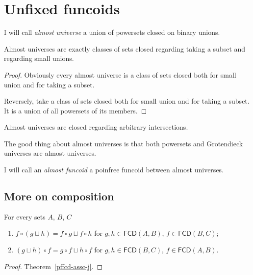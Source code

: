\chapter{Unfixed funcoids}

\begin{defn}
I will call \emph{almost universe}
a union of powersets closed on binary unions.
\end{defn}

\begin{prop}
Almost universes are exactly classes of sets closed regarding taking a subset and regarding small unions.
\end{prop}

\begin{proof}
Obviously every almost universe is a class of sets closed both for small union and for taking a subset.

Reversely, take a class of sets closed both for small union and for taking a subset. It is a union of all powersets of its members.
\end{proof}

\begin{obvious}
Almost universes are closed regarding arbitrary intersections.
\end{obvious}

The good thing about almost universes is that both powersets and Grotendieck universes are almost universes.

\begin{defn}
I will call an \emph{almost funcoid} a poinfree funcoid between almost universes.
\end{defn}

\section{More on composition}

\begin{lem}
For every sets $A$, $B$, $C$
\begin{enumerate}
\item $f\circ(g\sqcup h)=f\circ g\sqcup f\circ h$ for $g,h\in\mathsf{FCD}(A,B)$,
$f\in\mathsf{FCD}(B,C)$;
\item $(g\sqcup h)\circ f=g\circ f\sqcup h\circ f$ for
$g,h\in\mathsf{FCD}(B,C)$,
$f\in\mathsf{FCD}(A,B)$.
\end{enumerate}
\end{lem}

\begin{proof}
Theorem~\ref{pffcd-assc-j}.
\end{proof}

